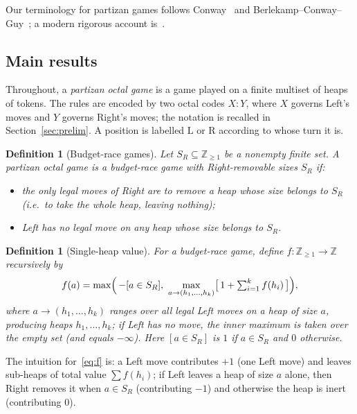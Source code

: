 \documentclass[11pt]{article}
\newtheorem{definition}[theorem]{Definition}
\newcommand{\outL}{\ensuremath{\mathrm{L}}}
\newcommand{\outR}{\ensuremath{\mathrm{R}}}
\begin{document}
Our terminology for partizan games follows Conway~\cite{ONAG} and
Berlekamp--Conway--Guy~\cite{WinningWays}; a modern rigorous account is~\cite{SiegelCGT}.

\subsection{Main results}

Throughout, a \emph{partizan octal game} is a game played on a finite multiset of heaps of
tokens. The rules are encoded by two octal codes $X:Y$, where $X$ governs Left's moves and
$Y$ governs Right's moves; the notation is recalled in Section~\ref{sec:prelim}. A position
is labelled $\outL$ or $\outR$ according to whose turn it is.

\begin{definition}[Budget-race games]\label{def:class}
Let $S_R\subseteq\mathbb{Z}_{\ge 1}$ be a nonempty finite set. A partizan octal game is a
\emph{budget-race game with Right-removable sizes $S_R$} if:
\begin{itemize}
\item[(i)] the only legal moves of Right are to remove a heap whose size belongs to $S_R$
(i.e.\ to take the whole heap, leaving nothing);
\item[(ii)] Left has no legal move on any heap whose size belongs to $S_R$.
\end{itemize}
\end{definition}

\begin{definition}[Single-heap value]\label{def:f}
For a budget-race game, define $f:\mathbb{Z}_{\ge1}\to\mathbb{Z}$ recursively by
\begin{equation}\label{eq:f}
f(a)=\max\Bigl(\,-[a\in S_R],\ 
\max_{a\to(h_1,\dots,h_k)}\bigl[\,1+\textstyle\sum_{i=1}^k f(h_i)\,\bigr]\Bigr),
\end{equation}
where $a\to(h_1,\dots,h_k)$ ranges over all legal Left moves on a heap of size $a$, producing
heaps $h_1,\dots,h_k$; if Left has no move, the inner maximum is taken over the empty set
(and equals $-\infty$). Here $[a\in S_R]$ is $1$ if $a\in S_R$ and $0$ otherwise.
\end{definition}

The intuition for~\eqref{eq:f} is: a Left move contributes $+1$ (one Left move) and leaves
sub-heaps of total value $\sum f(h_i)$; if Left leaves a heap of size $a$ alone, then Right
removes it when $a\in S_R$ (contributing $-1$) and otherwise the heap is inert
(contributing $0$).
\end{document}
